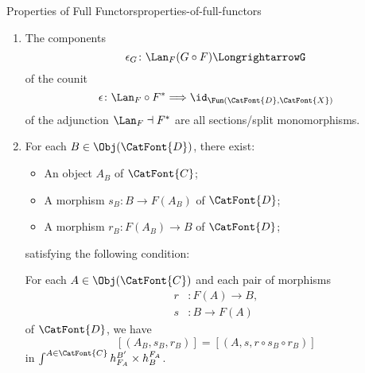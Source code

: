\begin{proposition}{Properties of Full Functors}{properties-of-full-functors}
\begin{enumerate}
\begin{enumerate}
\[                    \]%
                    of the unit
                    \[
                        \eta%
                        \colon%
                        \id_{\Fun(\CatFont{D},\CatFont{X})}%
                        \Longrightarrow%
                        \Ran_{F}\circ F^{*}%
                    \]%
                    of the adjunction $F^{*}\dashv\Ran_{F}$ are all retractions/split epimorphisms.
                \item\label{properties-of-full-functors-interaction-with-precomposition-4-d}The components
                    \[
                        \epsilon_{G}%
                        \colon%
                        \Lan_{F}(G\circ F)%
                        \Longrightarrow%
                        G%
                    \]%
                    of the counit
                    \[
                        \epsilon%
                        \colon%
                        \Lan_{F}\circ F^{*}%
                        \Longrightarrow%
                        \id_{\Fun(\CatFont{D},\CatFont{X})}%
                    \]%
                    of the adjunction $\Lan_{F}\dashv F^{*}$ are all sections/split monomorphisms.
                \item\label{properties-of-full-functors-interaction-with-precomposition-4-e}For each $B\in\Obj(\CatFont{D})$, there exist:
                    \begin{itemize}
                        \item An object $A_{B}$ of $\CatFont{C}$;
                        \item A morphism $s_{B}\colon B\to F(A_{B})$ of $\CatFont{D}$;
                        \item A morphism $r_{B}\colon F(A_{B})\to B$ of $\CatFont{D}$;
                    \end{itemize}
                    satisfying the following condition:
                    \begin{itemize}
                        \itemstar For each $A\in\Obj(\CatFont{C})$ and each pair of morphisms
                            \begin{align*}
                                r &\colon F(A) \to B,\\
                                s &\colon B    \to F(A)
                            \end{align*}
                            of $\CatFont{D}$, we have
                            \[
                                [(A_{B},s_{B},r_{B})]%
                                =%
                                [(A,s,r\circ s_{B}\circ r_{B})]%
                            \]%
                            in $\int^{A\in\CatFont{C}}h^{B'}_{F_{A}}\times h^{F_{A}}_{B}$.
                    \end{itemize}
            \end{enumerate}
    \end{enumerate}
\end{proposition}
